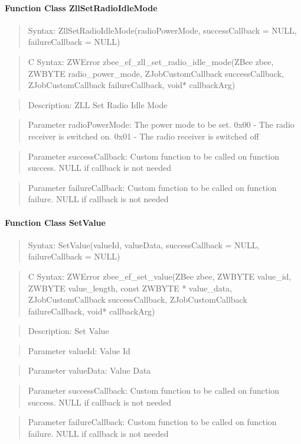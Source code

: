 \paragraph{Function Class ZllSetRadioIdleMode}
\begin{quote}Syntax: ZllSetRadioIdleMode(radioPowerMode, successCallback = NULL, failureCallback = NULL)\end{quote}
\begin{quote}C Syntax: ZWError zbee\_ef\_zll\_set\_radio\_idle\_mode(ZBee zbee, ZWBYTE radio\_power\_mode, ZJobCustomCallback successCallback, ZJobCustomCallback failureCallback, void* callbackArg)\end{quote}
\begin{quote}Description: ZLL Set Radio Idle Mode\end{quote}
\begin{quote}Parameter radioPowerMode: The power mode to be set. 0x00 - The radio receiver is switched on. 0x01 - The radio receiver is switched off\end{quote}
\begin{quote}Parameter successCallback: Custom function to be called on function success. NULL if callback is not needed\end{quote}
\begin{quote}Parameter failureCallback: Custom function to be called on function failure. NULL if callback is not needed\end{quote}


\paragraph{Function Class SetValue}
\begin{quote}Syntax: SetValue(valueId, valueData, successCallback = NULL, failureCallback = NULL)\end{quote}
\begin{quote}C Syntax: ZWError zbee\_ef\_set\_value(ZBee zbee, ZWBYTE value\_id, ZWBYTE value\_length, const ZWBYTE * value\_data, ZJobCustomCallback successCallback, ZJobCustomCallback failureCallback, void* callbackArg)\end{quote}
\begin{quote}Description: Set Value\end{quote}
\begin{quote}Parameter valueId: Value Id\end{quote}
\begin{quote}Parameter valueData: Value Data\end{quote}
\begin{quote}Parameter successCallback: Custom function to be called on function success. NULL if callback is not needed\end{quote}
\begin{quote}Parameter failureCallback: Custom function to be called on function failure. NULL if callback is not needed\end{quote}


